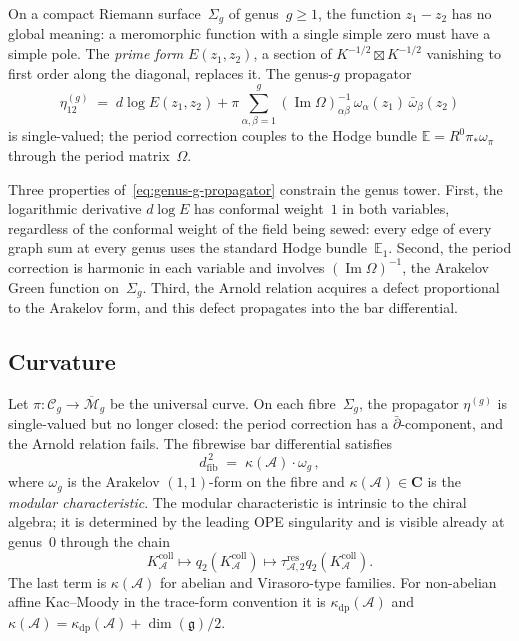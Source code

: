 \documentclass[11pt,reqno]{amsart}
\theoremstyle{definition}
\theoremstyle{remark}
\providecommand{\cA}{\mathcal{A}}
\providecommand{\cM}{\mathcal{M}}
\providecommand{\fg}{\mathfrak{g}}
\renewcommand{\Bbbk}{\mathbf{C}}
\numberwithin{equation}{section}
\begin{document}
On a compact Riemann surface~$\Sigma_g$ of genus~$g \ge 1$,
the function $z_1 - z_2$ has no global meaning: a
meromorphic function with a single simple zero must have a
simple pole. The \emph{prime form} $E(z_1, z_2)$, a
section of $K^{-1/2} \boxtimes K^{-1/2}$ vanishing to
first order along the diagonal, replaces it. The
genus-$g$ propagator
\begin{equation}\label{eq:genus-g-propagator}
\eta^{(g)}_{12}
\;=\;
d\log E(z_1, z_2)
+ \pi \sum_{\alpha,\beta = 1}^{g}
(\operatorname{Im}\Omega)^{-1}_{\alpha\beta}
\,\omega_\alpha(z_1)\,\bar\omega_\beta(z_2)
\end{equation}
is single-valued; the period correction couples to the
Hodge bundle $\mathbb{E} = R^0\pi_*\omega_\pi$ through
the period matrix~$\Omega$.

Three properties of~\eqref{eq:genus-g-propagator} constrain
the genus tower. First, the logarithmic derivative
$d\log E$ has conformal weight~$1$ in both variables,
regardless of the conformal weight of the field being
sewed: every edge of every graph sum at every genus uses
the standard Hodge bundle~$\mathbb{E}_1$. Second, the
period correction is harmonic in each variable and involves
$(\operatorname{Im}\Omega)^{-1}$, the Arakelov Green
function on~$\Sigma_g$. Third, the Arnold relation acquires
a defect proportional to the Arakelov form, and this defect
propagates into the bar differential.

\subsection{Curvature}
\label{ssec:curvature}

Let $\pi \colon \mathcal{C}_g \to \overline{\cM}_g$ be the
universal curve. On each fibre~$\Sigma_g$, the propagator
$\eta^{(g)}$ is single-valued but no longer closed: the
period correction has a $\bar\partial$-component, and the
Arnold relation fails. The fibrewise bar differential
satisfies
\begin{equation}\label{eq:d-squared-curvature}
d_{\mathrm{fib}}^{\,2}
\;=\;
\kappa(\cA) \cdot \omega_g\,,
\end{equation}
where $\omega_g$ is the Arakelov $(1,1)$-form on the fibre
and $\kappa(\cA) \in \Bbbk$ is the \emph{modular
characteristic}. The modular characteristic is intrinsic to
the chiral algebra; it is determined by the leading OPE
singularity and is visible already at genus~$0$ through the chain
\[
K_\cA^{\mathrm{coll}}\longmapsto
q_2(K_\cA^{\mathrm{coll}})\longmapsto
\tau_{\cA,2}^{\mathrm{res}}q_2(K_\cA^{\mathrm{coll}}).
\]
The last term is $\kappa(\cA)$ for abelian and Virasoro-type
families. For non-abelian affine Kac--Moody in the trace-form
convention it is $\kappa_{\mathrm{dp}}(\cA)$ and
$\kappa(\cA) = \kappa_{\mathrm{dp}}(\cA) + \dim(\fg)/2$.
\end{document}
